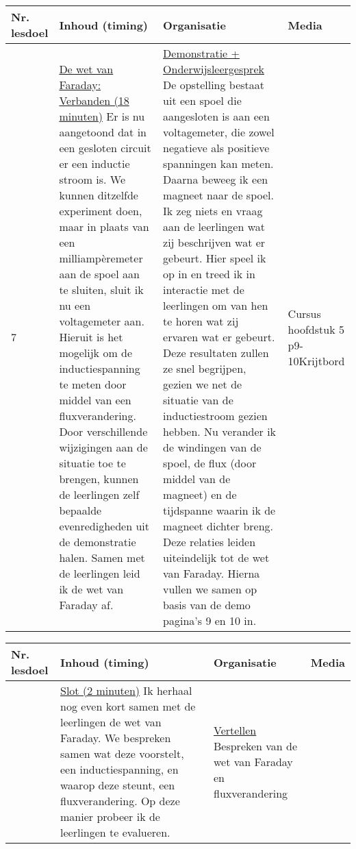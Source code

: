 \begin{landscape}
\begin{tabularx}{1.56\textwidth}{|p{1.5cm}|p{9cm}|X|p{4cm}|}
	\hline
	\textbf{Nr. lesdoel } & \textbf{Inhoud (timing)}  & \textbf{Organisatie } & \textbf{Media } \\ \hline
	7\newline\newline 8\newline\newline 9& \underline{De wet van Faraday:} \underline{Verbanden (18 minuten)}\newline
	Er is nu aangetoond dat in een gesloten circuit er een inductie stroom is. We kunnen ditzelfde experiment doen, maar in plaats van een milliampèremeter aan de spoel aan te sluiten, sluit ik nu een voltagemeter aan. Hieruit is het mogelijk om de inductiespanning te meten door middel van een fluxverandering. Door verschillende wijzigingen aan de situatie toe te brengen, kunnen de leerlingen zelf bepaalde evenredigheden uit de demonstratie halen. Samen met de leerlingen leid ik de wet van Faraday af.
	&  \underline{Demonstratie + Onderwijsleergesprek}\newline 
	De opstelling bestaat uit een spoel die aangesloten is aan een voltagemeter, die zowel negatieve als positieve spanningen kan meten. Daarna beweeg ik een magneet naar de spoel. Ik zeg niets en vraag aan de leerlingen wat zij beschrijven wat er gebeurt. Hier speel ik op in en treed ik in interactie met de leerlingen om van hen te horen wat zij ervaren wat er gebeurt.	Deze resultaten zullen ze snel begrijpen, gezien we net de situatie van de inductiestroom gezien hebben. Nu verander ik de windingen van de spoel, de flux (door middel van de magneet) en de tijdspanne waarin ik de magneet dichter breng. Deze relaties leiden uiteindelijk tot de wet van Faraday. Hierna vullen we samen op basis van de demo pagina's 9 en 10 in.
	&  Cursus hoofdstuk 5 p9-10\newline\newline Krijtbord
	\\ \hline
\end{tabularx}\vspace{5mm}


\begin{tabularx}{1.56\textwidth}{|p{1.5cm}|p{9cm}|X|p{4cm}|}
	\hline
	\textbf{Nr. lesdoel } & \textbf{Inhoud (timing)}  & \textbf{Organisatie } & \textbf{Media } \\ \hline
	& \underline{Slot (2 minuten)}\newline
	Ik herhaal nog even kort samen met de leerlingen de wet van Faraday. We bespreken samen wat deze voorstelt, een inductiespanning, en waarop deze steunt, een fluxverandering. Op deze manier probeer ik de leerlingen te evalueren.
	&  \underline{Vertellen}\newline 
	Bespreken van de wet van Faraday en fluxverandering
	&  
	\\ \hline
\end{tabularx}




	
\end{landscape}


